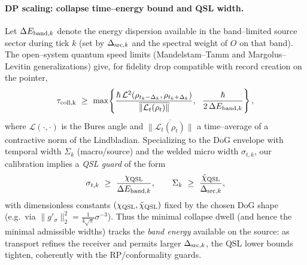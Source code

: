 \documentclass[10pt]{article}
\theoremstyle{definition}
\theoremstyle{plain}
\begin{document}
\paragraph{DP scaling: collapse time–energy bound and QSL width.}\label{par:uom-main-035}
Let $\Delta E_{{\rm band},k}$ denote the energy dispersion available in the
band–limited source sector during tick $k$ (set by $\Delta_{{\rm src},k}$ and the spectral
weight of $O$ on that band). The open–system quantum speed limits (Mandelstam–Tamm
and Margolus–Levitin generalizations) give, for fidelity drop compatible with record
creation on the pointer,
\[
\tau_{\rm coll,k}\ \ge\ \max\!\left\{\frac{\hbar\,\mathcal L^2(\rho_{t_k-\Delta_k},\rho_{t_k+\Delta_k})}{\overline{\|\mathcal L_t(\rho_t)\|}},\ \ \frac{\hbar}{2\,\Delta E_{{\rm band},k}}\right\},
\]
where $\mathcal L(\cdot,\cdot)$ is the Bures angle and $\overline{\|\mathcal L_t(\rho_t)\|}$ a
time–average of a contractive norm of the Lindbladian. Specializing to the DoG envelope
with temporal width $\Sigma_k$ (macro/source) and the welded micro width $\sigma_{t,k}$,
our calibration implies a \emph{QSL guard} of the form
\[
\sigma_{t,k}\ \ge\ \frac{\chi_{\rm QSL}}{\Delta E_{{\rm band},k}},
\qquad
\Sigma_k\ \ge\ \frac{\tilde\chi_{\rm QSL}}{\Delta_{{\rm src},k}},
\]
with dimensionless constants $(\chi_{\rm QSL},\tilde\chi_{\rm QSL})$ fixed by the chosen
DoG shape (e.g.\ via $\|g'_\sigma\|_2^2=\tfrac{1}{4\sqrt\pi}\sigma^{-3}$). Thus the minimal
collapse dwell (and hence the minimal admissible widths) tracks the \emph{band energy}
available on the source: as transport refines the receiver and permits larger
$\Delta_{{\rm src},k}$, the QSL lower bounds tighten, coherently with the RP/conformality guards.
\end{document}
